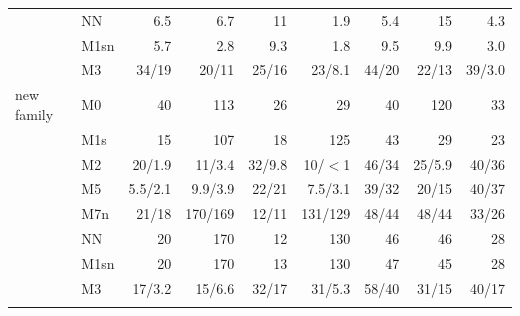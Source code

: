 \documentclass[pdflatex,sn-basic]{sn-jnl}
\begin{document}
\begin{table}[p]
\begin{tabular}{@{}llrrrrrrr@{}}
 & NN & 6.5 & 6.7 & 11 & 1.9 & 5.4 & 15 & 4.3 \\
 & M1sn & 5.7 & 2.8 & 9.3 & 1.8 & 9.5 & 9.9 & 3.0 \\
 & M3 & 34/19 & 20/11 & 25/16 & 23/8.1 & 44/20 & 22/13 & 39/3.0 \\
new family & M0 & 40 & 113 & 26 & 29 & 40 & 120 & 33 \\
 & M1s & 15 & 107 & 18 & 125 & 43 & 29 & 23 \\
 & M2 & 20/1.9 & 11/3.4 & 32/9.8 & 10/$<$1 & 46/34 & 25/5.9 & 40/36 \\
 & M5 & 5.5/2.1 & 9.9/3.9 & 22/21 & 7.5/3.1 & 39/32 & 20/15 & 40/37 \\
 & M7n & 21/18 & 170/169 & 12/11 & 131/129 & 48/44 & 48/44 & 33/26 \\
 & NN & 20 & 170 & 12 & 130 & 46 & 46 & 28 \\
 & M1sn & 20 & 170 & 13 & 130 & 47 & 45 & 28 \\
 & M3 & 17/3.2 & 15/6.6 & 32/17 & 31/5.3 & 58/40 & 31/15 & 40/17 \\
\botrule
\end{tabular}
\end{table}
\end{document}
